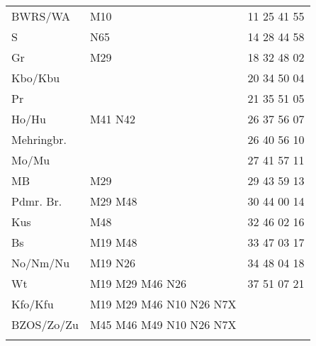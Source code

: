 \begin{tabular}{!{\color{schiefergrau}\vrule width 3pt}*{3}{l!{\color{schiefergrau}\vrule width 3pt}}}
\hline
{}
 \\
\hline
BWRS/WA    & \mtram{} M10                                                          & 11 25 41 55 \\
S          & \nbus{} N65                                                           & 14 28 44 58 \\
Gr         & \mbus{} M29                                                           & 18 32 48 02 \\
Kbo/Kbu    & \nuacht{}                                                             & 20 34 50 04 \\
Pr         &                                                                       & 21 35 51 05 \\
Ho/Hu      & \mbus{} M41 \nbus{} N42                                               & 26 37 56 07 \\
Mehringbr. & \nusechs{}                                                            & 26 40 56 10 \\
Mo/Mu      &                                                                       & 27 41 57 11 \\
MB         & \mbus{} M29                                                           & 29 43 59 13 \\
Pdmr. Br.  & \nuzwei{} \mbus{} M29 M48                                             & 30 44 00 14 \\
Kus        & \nuzwei{} \mbus{} M48                                                 & 32 46 02 16 \\
Bs         & \nuzwei{} \mbus{} M19 M48                                             & 33 47 03 17 \\
No/Nm/Nu   & \nuzwei{} \mbus{} M19 \nbus{} N26                                     & 34 48 04 18 \\
Wt         & \nuzwei{} \nudrei{} \mbus{} M19 M29 M46 \nbus{} N26                   & 37 51 07 21 \\
Kfo/Kfu    & \nuzwei{} \nudrei{} \nuneun{} \mbus{} M19 M29 M46 \nbus{} N10 N26 N7X & \\
BZOS/Zo/Zu & \nuzwei{} \nuneun{} \mbus{} M45 M46 M49 \nbus{} N10 N26 N7X           & \\
\myhline
\end{tabular}
